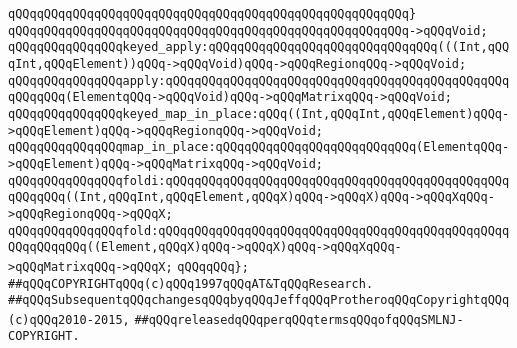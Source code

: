 \verb|qQQqqQQqqQQqqQQqqQQqqQQqqQQqqQQqqQQqqQQqqQQqqQQqqQQqqQQq}|\newline
\verb|qQQqqQQqqQQqqQQqqQQqqQQqqQQqqQQqqQQqqQQqqQQqqQQqqQQqqQQq->qQQqVoid;|\newline
\newline
\verb|qQQqqQQqqQQqqQQqkeyed_apply:qQQqqQQqqQQqqQQqqQQqqQQqqQQqqQQq(((Int,qQQqInt,qQQqElement))qQQq->qQQqVoid)qQQq->qQQqRegionqQQq->qQQqVoid;|\newline
\verb|qQQqqQQqqQQqqQQqapply:qQQqqQQqqQQqqQQqqQQqqQQqqQQqqQQqqQQqqQQqqQQqqQQqqQQqqQQq(ElementqQQq->qQQqVoid)qQQq->qQQqMatrixqQQq->qQQqVoid;|\newline
\newline
\verb|qQQqqQQqqQQqqQQqkeyed_map_in_place:qQQq((Int,qQQqInt,qQQqElement)qQQq->qQQqElement)qQQq->qQQqRegionqQQq->qQQqVoid;|\newline
\verb|qQQqqQQqqQQqqQQqmap_in_place:qQQqqQQqqQQqqQQqqQQqqQQqqQQq(ElementqQQq->qQQqElement)qQQq->qQQqMatrixqQQq->qQQqVoid;|\newline
\newline
\verb|qQQqqQQqqQQqqQQqfoldi:qQQqqQQqqQQqqQQqqQQqqQQqqQQqqQQqqQQqqQQqqQQqqQQqqQQqqQQq((Int,qQQqInt,qQQqElement,qQQqX)qQQq->qQQqX)qQQq->qQQqXqQQq->qQQqRegionqQQq->qQQqX;|\newline
\verb|qQQqqQQqqQQqqQQqfold:qQQqqQQqqQQqqQQqqQQqqQQqqQQqqQQqqQQqqQQqqQQqqQQqqQQqqQQqqQQq((Element,qQQqX)qQQq->qQQqX)qQQq->qQQqXqQQq->qQQqMatrixqQQq->qQQqX;|\newline
\newline
\verb|qQQqqQQq};|\newline
\newline
\newline
\newline
\newline
\verb|##qQQqCOPYRIGHTqQQq(c)qQQq1997qQQqAT&TqQQqResearch.|\newline
\verb|##qQQqSubsequentqQQqchangesqQQqbyqQQqJeffqQQqProtheroqQQqCopyrightqQQq(c)qQQq2010-2015,|\newline
\verb|##qQQqreleasedqQQqperqQQqtermsqQQqofqQQqSMLNJ-COPYRIGHT.|\newline

